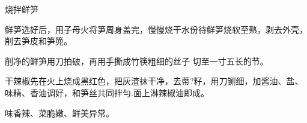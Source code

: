 \begin{recipe}{烧拌鲜笋}

\ingredients


\cooking

\step 鲜笋选好后，用子母火将笋周身盖完，慢慢烧干水份待鲜笋烧软至熟，剥去外壳，削去笋皮和笋篼。

削净的鲜笋用刀拍破，再用手撕成竹筷粗细的丝子 切至一寸五长的节。

\step 干辣椒先在火上烧成黑红色，把灰渣抹干净，去蒂?籽，用刀铡细，加酱油、盐、味精、香油调好，和笋丝共同拌勻.面上淋辣椒油即成。

\notes

味香辣、菜脆嫩、鲜美异常。

\end{recipe}

